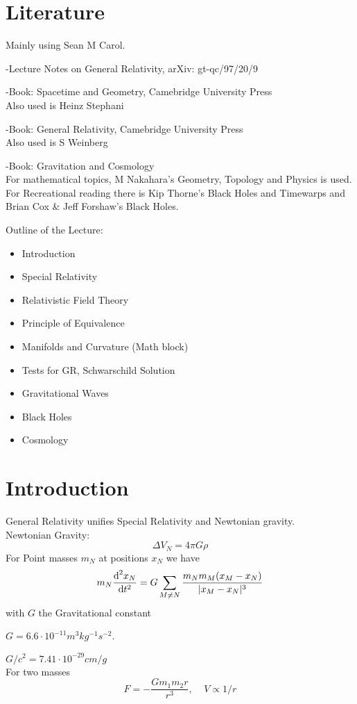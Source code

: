 \section{Literature} 
Mainly using Sean M Carol.

-Lecture Notes on General Relativity, arXiv: gt-qc/97/20/9

-Book: Spacetime and Geometry, Camebridge University Press\\
Also used is Heinz Stephani

-Book: General Relativity, Camebridge University Press\\
Also used is S Weinberg

-Book: Gravitation and Cosmology\\
For mathematical topics, M Nakahara's Geometry, Topology and Physics is used. For Recreational reading there is Kip Thorne's Black Holes and Timewarps and Brian Cox \& Jeff Forshaw's Black Holes.

Outline of the Lecture:
\begin{itemize}
	\item Introduction
	\item Special Relativity
	\item Relativistic Field Theory
	\item Principle of Equivalence
	\item Manifolds and Curvature (Math block)
	\item Tests for GR, Schwarschild Solution
	\item Gravitational Waves
	\item Black Holes
	\item Cosmology
\end{itemize}

\section{Introduction}

General Relativity unifies Special Relativity and Newtonian gravity.\\
Newtonian Gravity:
$$
\Delta V_{N} = 4\pi G\rho
$$
For Point masses $m_N$ at positions $x_N$ we have
$$
m_N \frac{\text d^2 x_N}{\text dt^2} = G\sum_{M\neq N}\frac{m_N m_M (x_M - x_N)}{|x_M-x_N|^3}
$$
with $G$ the Gravitational constant 

$G = 6.6\cdot 10^{-11} m^3 kg^{-1} s^{-2}$. 

$G/c^2 = 7.41 \cdot 10^{-29} cm/g$\\
For two masses
$$
F = -\frac{Gm_1m_2 r}{r^3},\;\;\;\; V\propto 1/r
$$

